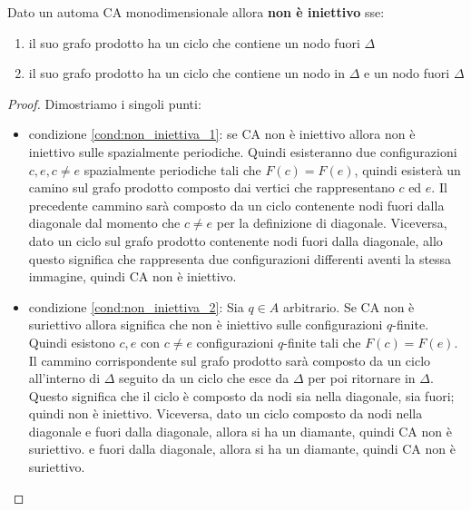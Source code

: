 \begin{teorema}
    Dato un automa CA monodimensionale allora \textbf{non è iniettivo} sse:
    \begin{enumerate}
        \item \label{cond:non_iniettiva_1} il suo grafo prodotto ha un ciclo che contiene un nodo fuori $\Delta$
        \item \label{cond:non_iniettiva_2}il suo grafo prodotto ha un ciclo che contiene un nodo in $\Delta$ e
              un nodo fuori $\Delta$
    \end{enumerate}
    \begin{proof}
        Dimostriamo i singoli punti:
        \begin{itemize}
            \item condizione \ref{cond:non_iniettiva_1}: se CA non è iniettivo
                  allora non è iniettivo sulle spazialmente periodiche. Quindi esisteranno
                  due configurazioni $c,e, c\ne e$ spazialmente periodiche tali che $F(c) = F(e)$,
                  quindi esisterà un camino sul grafo prodotto composto dai vertici che
                  rappresentano $c$ ed $e$. Il precedente cammino sarà composto da un ciclo
                  contenente nodi fuori dalla diagonale dal momento che $c\ne e$ per la
                  definizione di diagonale. Viceversa, dato un ciclo sul grafo prodotto contenente nodi
                  fuori dalla diagonale, allo questo significa che rappresenta due
                  configurazioni differenti aventi la stessa immagine, quindi CA non è
                  iniettivo.
            \item condizione \ref{cond:non_iniettiva_2}: Sia $q\in A$ arbitrario.
                  Se CA non è suriettivo allora significa che non è iniettivo sulle
                  configurazioni $q$-finite. Quindi esistono $c,e$ con $c\ne e $ configurazioni
                  $q$-finite tali che $F(c) =F(e)$. Il cammino corrispondente sul
                  grafo prodotto sarà composto da un ciclo all'interno di $\Delta$
                  seguito da un ciclo che esce da $\Delta$ per poi ritornare in $\Delta$.
                  Questo significa che il ciclo è composto da nodi sia nella diagonale,
                  sia fuori; quindi non è iniettivo. Viceversa, dato un ciclo composto da nodi nella diagonale
                  e fuori dalla diagonale, allora si ha un diamante, quindi CA non è suriettivo.
                  e fuori dalla diagonale, allora si ha un diamante, quindi CA non è suriettivo.

        \end{itemize}
    \end{proof}
\end{teorema}


